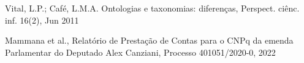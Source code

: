 \documentclass[
12pt,		%
openright,	%
twoside,  %
a4paper,			%
chapter=TITLE,		%
english,			%
french,				%
spanish,			%
brazil				%
]{USPSC-classe/USPSC}
\begin{document}
\begin{flushleft}
\begin{flushleft}
\begin{flushleft}
\begin{flushleft}
\begin{flushleft}
\begin{flushleft}
\begin{flushleft}
\begin{flushleft}
\begin{flushleft}
 Vital, L.P.; Caf\'e, L.M.A. Ontologias e taxonomias: diferen\c{c}as, Perspect. ci\^enc. inf. 16(2), Jun 2011
\end{flushleft}


\end{flushleft}


\end{flushleft}


\end{flushleft}


\end{flushleft}


\end{flushleft}


\end{flushleft}


\end{flushleft}


\end{flushleft}


\begin{flushleft}
\begin{flushleft}
\begin{flushleft}
\begin{flushleft}
\begin{flushleft}
\begin{flushleft}
\begin{flushleft}
\begin{flushleft}
\begin{flushleft}
[WASHCNPq, 2022] Mammana et al., Relat\'orio de Presta\c{c}\~ao de Contas para o CNPq da emenda Parlamentar do Deputado Alex Canziani, Processo 401051/2020-0, 2022
\end{flushleft}


\end{flushleft}


\end{flushleft}


\end{flushleft}


\end{flushleft}


\end{flushleft}


\end{flushleft}


\end{flushleft}


\end{flushleft}
\end{document}
